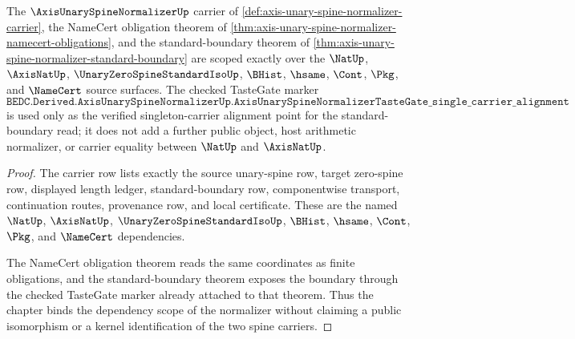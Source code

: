 \begin{theorem}
\label{thm:axis-unary-spine-normalizer-scope-binding}
The $\AxisUnarySpineNormalizerUp$ carrier of \autoref{def:axis-unary-spine-normalizer-carrier}, the NameCert obligation theorem of \autoref{thm:axis-unary-spine-normalizer-namecert-obligations}, and the standard-boundary theorem of \autoref{thm:axis-unary-spine-normalizer-standard-boundary} are scoped exactly over the $\NatUp$, $\AxisNatUp$, $\UnaryZeroSpineStandardIsoUp$, $\BHist$, $\hsame$, $\Cont$, $\Pkg$, and $\NameCert$ source surfaces. The checked TasteGate marker
$$
\texttt{BEDC.Derived.AxisUnarySpineNormalizerUp.AxisUnarySpineNormalizerTasteGate\_single\_carrier\_alignment}
$$
is used only as the verified singleton-carrier alignment point for the standard-boundary read; it does not add a further public object, host arithmetic normalizer, or carrier equality between $\NatUp$ and $\AxisNatUp$.
\end{theorem}
\begin{proof}
The carrier row lists exactly the source unary-spine row, target zero-spine row, displayed length ledger, standard-boundary row, componentwise transport, continuation routes, provenance row, and local certificate. These are the named $\NatUp$, $\AxisNatUp$, $\UnaryZeroSpineStandardIsoUp$, $\BHist$, $\hsame$, $\Cont$, $\Pkg$, and $\NameCert$ dependencies.

The NameCert obligation theorem reads the same coordinates as finite obligations, and the standard-boundary theorem exposes the boundary through the checked TasteGate marker already attached to that theorem. Thus the chapter binds the dependency scope of the normalizer without claiming a public isomorphism or a kernel identification of the two spine carriers.
\end{proof}



